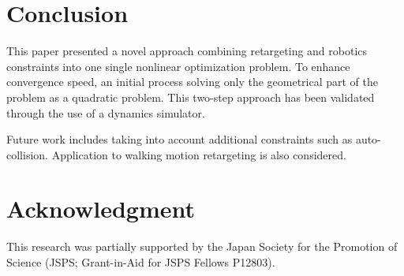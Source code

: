\documentclass[letterpaper, 10 pt, conference]{ieeeconf}  %
\begin{document}
\section{Conclusion}
\label{sec:conclusion}

This paper presented a novel approach combining retargeting and
robotics constraints into one single nonlinear optimization
problem. To enhance convergence speed, an initial process solving only
the geometrical part of the problem as a quadratic problem. This
two-step approach has been validated through the use of a dynamics
simulator.

Future work includes taking into account additional constraints such
as auto-collision. Application to walking motion retargeting is also
considered.








%
%
\section*{Acknowledgment}

This research was partially supported by the Japan Society for the
Promotion of Science (JSPS; Grant-in-Aid for JSPS Fellows P12803).





\end{document}
